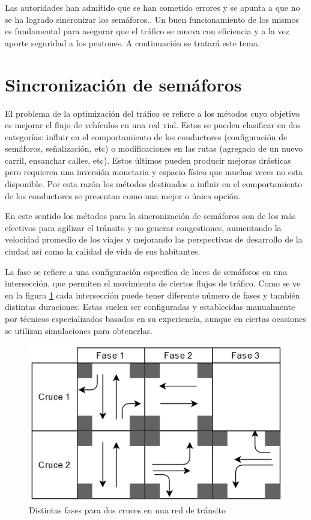Las autoridades han admitido que se han cometido errores y se apunta a que no se ha logrado sincronizar los semáforos.\citep{olivera2013}. Un buen funcionamiento de los mismos es fundamental para asegurar que el tráfico se mueva con eficiencia y a la vez aporte seguridad a los peatones. A continuación se tratará este tema. 


\section{Sincronización de semáforos}
El problema de la optimización del tráfico se refiere a los métodos cuyo objetivo es mejorar el flujo de vehículos en una red vial. Estos se pueden clasificar en dos categorías: influir en el comportamiento de los conductores (configuración de semáforos, señalización, etc) o modificaciones en las rutas (agregado de un nuevo carril, ensanchar calles, etc). 
Estos últimos pueden producir mejoras drásticas pero requieren una inversión monetaria y espacio físico que muchas veces no esta disponible. Por esta razón los métodos destinados a influir en el comportamiento de los conductores se presentan como una mejor o única opción.

En este sentido los métodos para la sincronización de semáforos son de los más efectivos para agilizar el tránsito y no generar congestiones, aumentando la velocidad promedio de los viajes y mejorando las perspectivas de desarrollo de la ciudad así como la calidad de vida de sus habitantes. 

La fase se refiere a una configuración especifica de luces de semáforos en una intersección, que permiten el movimiento de ciertos flujos de tráfico. Como se ve en la figura \ref{fig:fases} cada intersección puede tener diferente número de fases y también distintas duraciones. Estas suelen ser configuradas y establecidas manualmente por técnicos especializados basados en su experiencia, aunque en ciertas ocasiones se utilizan simulaciones para obtenerlas. 

\begin{figure}[H]
	\centering
	\includegraphics[width=0.8\linewidth]{Figures/fases1}
	\caption{Distintas fases para dos cruces en una red de tránsito}
	\label{fig:fases}
\end{figure}

